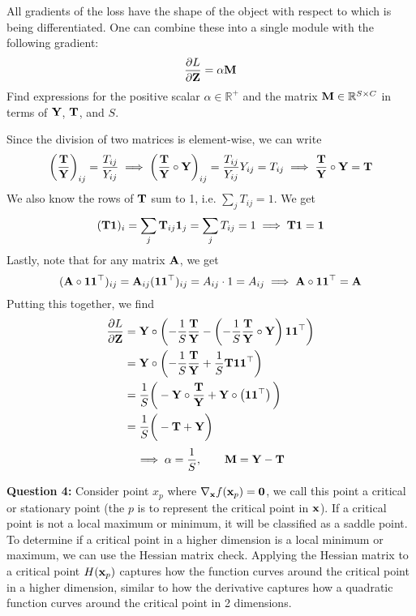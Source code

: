 \documentclass[a4paper]{article}
\newcommand{\R}{\mathbb{R}}
\newcommand{\1}{\mathbbm{1}}
\renewcommand{\a}{\alpha}
\renewcommand{\l}{\left}
\renewcommand{\r}{\right}
\newcommand{\<}{\langle}
\renewcommand{\>}{\rangle}
\newcommand{\pp}[2]{\frac{\partial #1}{\partial #2}}
\newcommand{\bs}{\boldsymbol}
\begin{document}
All gradients of the loss have the shape of the object with respect to which is being differentiated. One can combine these into a single module with the following gradient:
$$\pp{L}{\bold Z} = \a \bold M$$
Find expressions for the positive scalar $\a \in \R^+$ and the matrix $\bold M \in \R^{S \times C}$ in terms of $\bold Y$, $\bold T$, and $S$.

\begin{ans}
Since the division of two matrices is element-wise, we can write
$$\l( \frac{\bold T}{\bold Y} \r)_{ij} = \frac{T_{ij}}{Y_{ij}} \implies \l( \frac{\bold T}{\bold Y} \circ \bold Y \r)_{ij} = \frac{T_{ij}}{Y_{ij}} Y_{ij} = T_{ij} \implies \frac{\bold T}{\bold Y} \circ \bold Y = \bold T$$
We also know the rows of $\bold T$ sum to 1, i.e. $\sum_j T_{ij} = 1$. We get
$$(\bold T \bs1)_i = \sum_j \bold T_{ij} \bs1_j = \sum_j T_{ij} = 1 \implies \bold T \bs1 = \bs1$$
Lastly, note that for any matrix $\bold A$, we get
$$(\bold A \circ \bs1 \bs1^\top)_{ij} = \bold A_{ij} (\bs1\bs1^\top)_{ij} = A_{ij} \cdot 1 = A_{ij} \implies \bold A \circ \bs1 \bs1^\top = \bold A$$
Putting this together, we find
\begin{align*}
\pp{L}{\bold Z} &= \bold Y \circ \l( -\frac1S \frac{\bold T}{\bold Y} - \l(-\frac1S \frac{\bold T}{\bold Y} \circ \bold Y \r) \bs1 \bs1^\top \r) \\
&= \bold Y \circ \l( -\frac1S \frac{\bold T}{\bold Y} + \frac1S \bold T \bs1 \bs1^\top \r) \\
&= \frac1S \bigg( - \bold Y \circ \frac{\bold T}{\bold Y} + \bold Y \circ \l( \bs1 \bs1^\top \r) \bigg) \\
&= \frac1S \bigg( - \bold T + \bold Y \bigg)
\end{align*}
$$\implies \a = \frac1S, \quad \quad \bold M = \bold Y - \bold T$$
\end{ans}



\textbf{Question 4:} Consider point $x_p$ where $\nabla_{\bold x} f(\bold x_p) = \bs0$, we call this point a critical or stationary point (the $p$ is to represent the critical point in $\bold x$). If a critical point is not a local maximum or minimum, it will be classified as a saddle point. To determine if a critical point in a higher dimension is a local minimum or maximum, we can use the Hessian matrix check. Applying the Hessian matrix to a critical point $H(\bold x_p)$ captures how the function curves around the critical point in a higher dimension, similar to how the derivative captures how a quadratic function curves around the critical point in 2 dimensions.
\end{document}
